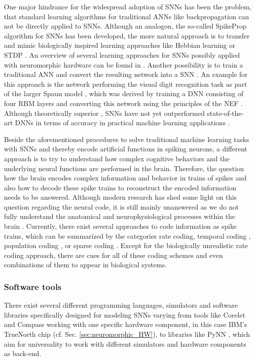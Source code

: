 One major hindrance for the widespread adoption of \acp{SNN} has been the problem, that standard learning algorithms for traditional \acp{ANN} like backpropagation \cite{Werbos1974} can not be directly applied to \acp{SNN}.
Although an analogon, the so-called SpikeProp algorithm \cite{Bohte2002} for \acp{SNN} has been developed, the more natural approach is to transfer and mimic biologically inspired learning approaches like Hebbian learning \cite{Hebb1949} or \ac{STDP} \cite{Bi2001}.
An overview of several learning approaches for \acp{SNN} possibly applied with neuromorphic hardware can be found in \cite{Walter2015}.
Another possibility is to train a traditional \ac{ANN} and convert the resulting network into a \ac{SNN} \cite{Diehl2015, Hunsberger2015}.
An example for this approach is the network performing the visual digit recognition task as part of the larger \ac{Spaun} model \cite{Eliasmith2012}, which was derived by training a \ac{DNN} consisting of four \ac{RBM} layers and converting this network using the principles of the \ac{NEF} \cite{Eliasmith2003}.
Although theoretically superior \cite{Maass1997}, \acp{SNN} have not yet outperformed state-of-the-art \acp{DNN} in terms of accuracy in practical machine learning applications \cite{Schmidhuber2015}.

Beside the aforementioned procedures to solve traditional machine learning tasks with \acp{SNN} and thereby encode artificial functions in spiking neurons, a different approach is to try to understand how complex cognitive behaviors and the underlying neural functions are performed in the brain.
Therefore, the question how the brain encodes complex information and behavior in trains of spikes and also how to decode these spike trains to reconstruct the encoded information needs to be answered.
Although modern research has shed some light on this question regarding the neural code, it is still mainly unanswered as we do not fully understand the anatomical and neurophysiological processes within the brain \cite{Stanley2013}.
Currently, there exist several approaches to code information as spike trains, which can be summarized by the categories rate coding, temporal coding \cite[Chap. 7.6]{Gerstner2014}, population coding \cite[Chap. 1]{Gerstner2002}, \cite{Ponulak2011, Boerlin2011} or sparse coding \cite{Olshausen1996}.
Except for the biologically unrealistic rate coding approach, there are cues for all of these coding schemes and even combinations \cite{Gupta2014} of them to appear in biological systems.

\subsubsection{Software tools}
There exist several different programming languages, simulators and software libraries specifically designed for modeling \acp{SNN} varying from tools like Corelet \cite{Amir2013} and Compass \cite{Preissl2012} working with one specific hardware component, in this case IBM's TrueNorth chip \cite{Akopyan2015} (cf. Sec. \ref{sec:neuromorphic_HW}), to libraries like \ac{PyNN} \cite{Davison2008}, which aim for universality to work with different simulators and hardware components as back-end.

